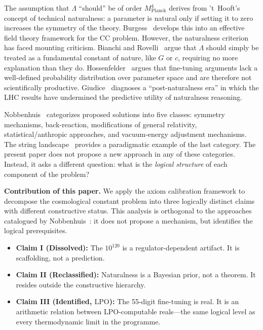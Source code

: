 \documentclass[11pt,a4paper]{article}
\theoremstyle{plain}
\theoremstyle{definition}
\newcommand{\LPO}{\ensuremath{\mathrm{LPO}}}
\newcommand{\MPl}{M_{\mathrm{Planck}}}
\begin{document}
The assumption that $\Lambda$ ``should'' be of order $\MPl^4$
derives from 't~Hooft's~\cite{tHooft1980} concept of technical
naturalness: a parameter is natural only if setting it to zero
increases the symmetry of the theory.
Burgess~\cite{Burgess2013} develops this into an effective field
theory framework for the CC problem.  However, the naturalness
criterion has faced mounting criticism.
Bianchi and Rovelli~\cite{BianchiRovelli2010} argue that $\Lambda$
should simply be treated as a fundamental constant of nature, like
$G$ or $c$, requiring no more explanation than they do.
Hossenfelder~\cite{Hossenfelder2019} argues that fine-tuning arguments
lack a well-defined probability distribution over parameter space and
are therefore not scientifically productive.
Giudice~\cite{Giudice2017} diagnoses a ``post-naturalness era'' in
which the LHC results have undermined the predictive utility of
naturalness reasoning.

Nobbenhuis~\cite{Nobbenhuis2006} categorizes proposed solutions into
five classes: symmetry mechanisms, back-reaction, modifications of
general relativity, statistical/anthropic approaches, and
vacuum-energy adjustment mechanisms.  The string
landscape~\cite{BoussoPolchinski2000,Polchinski2006} provides a
paradigmatic example of the last category.  The present paper does
not propose a new approach in any of these categories.  Instead,
it asks a different question: what is the \emph{logical structure}
of each component of the problem?

\medskip\noindent
\textbf{Contribution of this paper.}\quad
We apply the axiom calibration framework to decompose the cosmological
constant problem into three logically distinct claims with different
constructive status.  This analysis is orthogonal to the approaches
catalogued by Nobbenhuis~\cite{Nobbenhuis2006}: it does not propose
a mechanism, but identifies the logical prerequisites.
\begin{itemize}[nosep]
\item \textbf{Claim I (Dissolved):} The $10^{120}$ is a
  regulator-dependent artifact.  It is scaffolding, not a prediction.
\item \textbf{Claim II (Reclassified):} Naturalness is a Bayesian
  prior, not a theorem.  It resides outside the constructive hierarchy.
\item \textbf{Claim III (Identified, $\LPO$):} The 55-digit
  fine-tuning is real.  It is an arithmetic relation between
  $\LPO$-computable reals---the same logical level as every
  thermodynamic limit in the programme.
\end{itemize}
\end{document}
